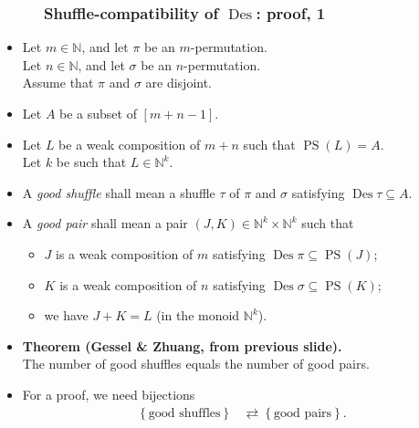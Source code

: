 \documentclass{beamer}
\newcommand{\NN}{{\mathbb N}}
\newcommand{\Des}{\operatorname{Des}}
\newcommand{\PS}{\operatorname{PS}}
\newcommand{\fti}[1]{\frametitle{\ \ \ \ \ #1}}
\newcommand{\set}[1]{\left\{ #1 \right\}}
\newcommand{\tup}[1]{\left( #1 \right)}
\newcommand{\ive}[1]{\left[ #1 \right]}
\newcommand{\defn}[1]{{\color{darkred}\emph{#1}}} %
\theoremstyle{plain}
\begin{document}
\begin{frame}
\fti{Shuffle-compatibility of $\Des$: proof, 1}

\begin{itemize}

\item Let $m \in \NN$, and let $\pi$ be an $m$-permutation. \\
      Let $n \in \NN$, and let $\sigma$ be an $n$-permutation. \\
      Assume that $\pi$ and $\sigma$ are disjoint.

\item Let $A$ be a subset of $\ive{m+n-1}$. \\

\item Let $L$ be a weak composition of $m+n$ such that
      $\PS\tup{L} = A$.
      \\ Let $k$ be such that $L \in \NN^k$.

\pause

\item A \defn{good shuffle} shall mean a
      shuffle $\tau$ of $\pi$ and $\sigma$ satisfying
      $\Des \tau \subseteq A$.

\item A \defn{good pair} shall mean a pair
      $\tup{J, K} \in \NN^k \times \NN^k$ such that
      \begin{itemize}
      \item $J$ is a weak composition of $m$ satisfying $\Des \pi \subseteq \PS \tup{J}$;
      \item $K$ is a weak composition of $n$ satisfying $\Des \sigma \subseteq \PS \tup{K}$;
      \item we have $J + K = L$ (in the monoid $\NN^k$).
      \end{itemize}

\item \textbf{Theorem (Gessel \& Zhuang, from previous slide).} \\
      The number of good shuffles equals the number of good pairs.

\pause

\item For a proof, we need bijections
      \begin{align*}
               \set{\text{good shuffles}}
               &\rightleftarrows
               \set{\text{good pairs}} .
      \end{align*}

\end{itemize}

\vspace{10cm}

\end{frame}
\end{document}
